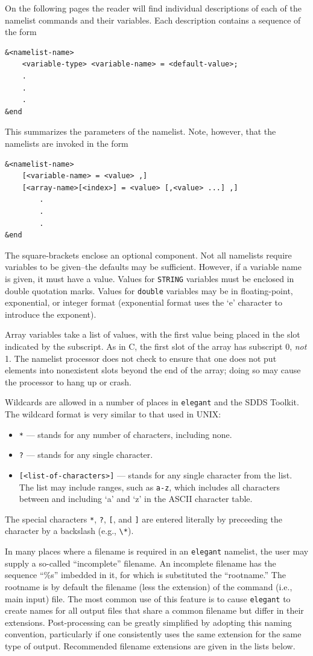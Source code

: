\documentclass[11pt]{article}
\begin{document}
On the following pages the reader will find individual descriptions of each of the namelist commands and their 
variables.  Each description contains a sequence of the form
\begin{verbatim}
&<namelist-name>
    <variable-type> <variable-name> = <default-value>;
    .
    .
    .
&end
\end{verbatim}
This summarizes the parameters of the namelist.  Note, however, that the namelists are invoked in the form
\begin{verbatim}
&<namelist-name>
    [<variable-name> = <value> ,]
    [<array-name>[<index>] = <value> [,<value> ...] ,]
        .
        .
        .
&end
\end{verbatim}
The square-brackets enclose an optional component.  Not all namelists require variables to 
be given--the defaults may be sufficient.  However, if a variable name
is given, it must have a value.  Values for \verb|STRING| variables
must be enclosed in double quotation marks.  Values for \verb|double|
variables may be in floating-point, exponential, or integer format
(exponential format uses the `e' character to introduce the exponent).

Array variables take a list of values, with the first value being
placed in the slot indicated by the subscript.  As in C, the first
slot of the array has subscript 0, {\em not} 1.  The namelist
processor does not check to ensure that one does not put elements into
nonexistent slots beyond the end of the array; doing so may cause the
processor to hang up or crash.

Wildcards are allowed in a number of places in {\tt elegant} and the SDDS Toolkit.  The wildcard format is
very similar to that used in UNIX:
\begin{itemize}
\item \verb|*| --- stands for any number of characters, including none.
\item \verb|?| --- stands for any single character.
\item \verb|[<list-of-characters>]| --- stands for any single character from the list.  The list may include
ranges, such as \verb|a-z|, which includes all characters between and including `a' and `z' in the ASCII
character table.
\end{itemize}
The special characters \verb|*|, \verb|?|, \verb|[|, and \verb|]| are entered literally by preceeding the character by a
backslash (e.g., \verb|\*|).

In many places where a filename is required in an {\tt elegant}
namelist, the user may supply a so-called ``incomplete'' filename.  An
incomplete filename has the sequence ``\%s'' imbedded in it, for which
is substituted the ``rootname.''  The rootname is by default the
filename (less the extension) of the command (i.e., main input) file.  The most common
use of this feature is to cause {\tt elegant} to create names for all
output files that share a common filename but differ in their
extensions.  Post-processing can be greatly simplified by adopting
this naming convention, particularly if one consistently uses the same
extension for the same type of output.  Recommended filename
extensions are given in the lists below.
\end{document}
